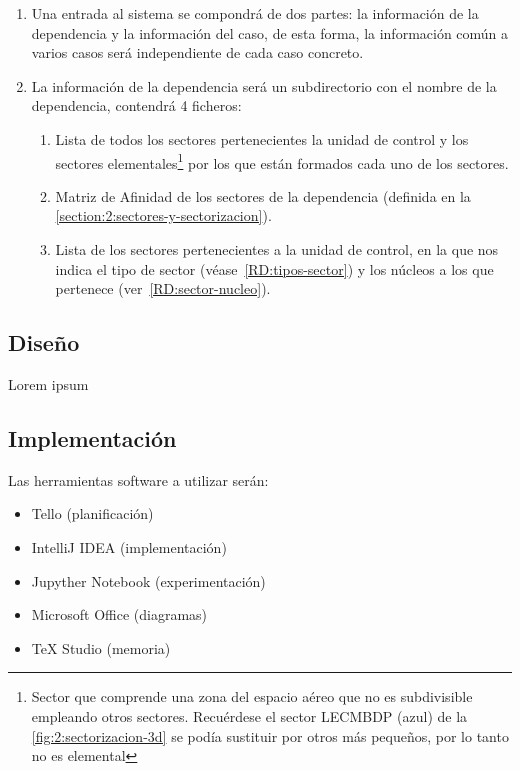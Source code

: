 \begin{enumerate}[label={\textbf{RIO\arabic*}}, ref={RC\arabic*},  align=left]
	
	\item  Una entrada al sistema se compondrá de dos partes: la información de la dependencia y la información del caso, de esta forma, la información común a varios casos será independiente de cada caso concreto.
	
	\item La información de la dependencia será un subdirectorio con el nombre de la dependencia, contendrá 4 ficheros:
	\begin{enumerate}[label*={\textbf{.\arabic*}}]
		\item  Lista de todos los sectores pertenecientes la unidad de control y los sectores elementales\footnote{
			Sector que comprende una zona del espacio aéreo que no es subdivisible empleando otros sectores. Recuérdese el sector LECMBDP (azul) de la \autoref{fig:2:sectorizacion-3d} se podía sustituir por otros más pequeños, por lo tanto no es elemental
		} por los que están formados cada uno de los sectores.
		
		\item  Matriz de Afinidad de los sectores de la dependencia (definida en la \autoref{section:2:sectores-y-sectorizacion}).
		
		\item Lista de los sectores pertenecientes a la unidad de control, en la que nos indica el tipo de sector (véase~\ref{RD:tipos-sector}) y los núcleos a los que pertenece (ver~\ref{RD:sector-nucleo}).
	\end{enumerate}
	
\end{enumerate}

\subsection{Diseño}
Lorem ipsum

\subsection{Implementación}
\label{sec:4:implementacion}

Las herramientas software a utilizar serán:
\begin{itemize}
	\item Tello (planificación)
	\item IntelliJ IDEA (implementación)
	\item Jupyther Notebook (experimentación)
	\item Microsoft Office (diagramas)
	\item \TeX{} Studio (memoria)
\end{itemize}



